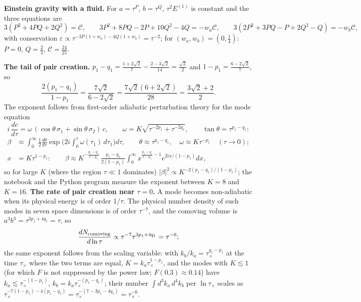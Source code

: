 \documentclass[10pt,a4paper]{article}
\begin{document}
\textbf{Einstein gravity with a fluid.} For $a=\tau^P$, $b=\tau^Q$, $\tau^2E^{(1)}$ is constant and the three equations are
\begin{equation*}
3(P^2+4PQ+2Q^2)=\mathcal C,\qquad 3P^2+8PQ-2P+10Q^2-4Q=-w_a\mathcal C,\qquad 3(2P^2+3PQ-P+2Q^2-Q)=-w_b\mathcal C,
\end{equation*}
with conservation $\varepsilon\propto\tau^{-3P(1+w_a)-4Q(1+w_b)}=\tau^{-2}$; for $(w_a,w_b)=(0,\tfrac14)$: $P=0$, $Q=\tfrac25$, $\mathcal C=\tfrac{24}{25}$.

\textbf{The tail of pair creation.} $p_1-q_1=\frac{1+2\sqrt2}7-\frac{2-3\sqrt2}{14}=\frac{\sqrt2}2$ and $1-p_1=\frac{6-2\sqrt2}7$, so
\begin{equation*}
\frac{2(p_1-q_1)}{1-p_1}=\frac{7\sqrt2}{6-2\sqrt2}=\frac{7\sqrt2(6+2\sqrt2)}{28}=\frac{3\sqrt2+2}2 .
\end{equation*}
The exponent follows from first-order adiabatic perturbation theory for the mode equation
\begin{equation*}
i\,\frac{dc}{d\tau}=\omega\,(\cos\theta\,\sigma_1+\sin\theta\,\sigma_2)\,c,\qquad \omega=K\sqrt{\tau^{-2p_1}+\tau^{-2q_1}},\qquad \tan\theta=\tau^{p_1-q_1}:
\end{equation*}
\begin{align*}
\beta&\approx\int_0^\infty\frac{1}{2}\frac{d\theta}{d\tau}\exp\Big(2i\int_0^\tau\omega(\tau_1)\,d\tau_1\Big)d\tau,\qquad \theta\approx\tau^{p_1-q_1},\quad \omega\approx K\tau^{-p_1}\quad(\tau\to0); \\
x&=K\tau^{1-p_1}:\qquad \beta\approx K^{-\frac{p_1-q_1}{1-p_1}}\,\frac{p_1-q_1}{2(1-p_1)}\int_0^\infty x^{\frac{p_1-q_1}{1-p_1}-1}e^{2ix/(1-p_1)}dx,
\end{align*}
so for large $K$ (where the region $\tau\ll1$ dominates) $|\beta|^2\propto K^{-2(p_1-q_1)/(1-p_1)}$; the notebook and the Python program measure the exponent between $K=8$ and $K=16$. \textbf{The rate of pair creation near $\tau=0$.} A mode becomes non-adiabatic when its physical energy is of order $1/\tau$. The physical number density of such modes in seven space dimensions is of order $\tau^{-7}$, and the comoving volume is $a^3b^4=\tau^{3p_1+4q_1}=\tau$, so
\begin{equation*}
\frac{dN_{\rm comoving}}{d\ln\tau}\propto\tau^{-7}\tau^{3p_1+4q_1}=\tau^{-6};
\end{equation*}
the same exponent follows from the scaling variable: with $k_b/k_a=\tau_\times^{q_1-p_1}$ at the time $\tau_\times$ where the two terms are equal, $K=k_a\tau_\times^{1-p_1}$, and the modes with $K\lesssim1$ (for which $F$ is not suppressed by the power law; $F(0.3)\approx0.14$) have $k_a\lesssim\tau_\times^{-(1-p_1)}$, $k_b=k_a\tau_\times^{-(p_1-q_1)}$; their number $\int d^3k_a\,d^4k_b$ per $\ln\tau_\times$ scales as $\tau_\times^{-7(1-p_1)-4(p_1-q_1)}=\tau_\times^{-(7-3p_1-4q_1)}=\tau_\times^{-6}$.
\end{document}
